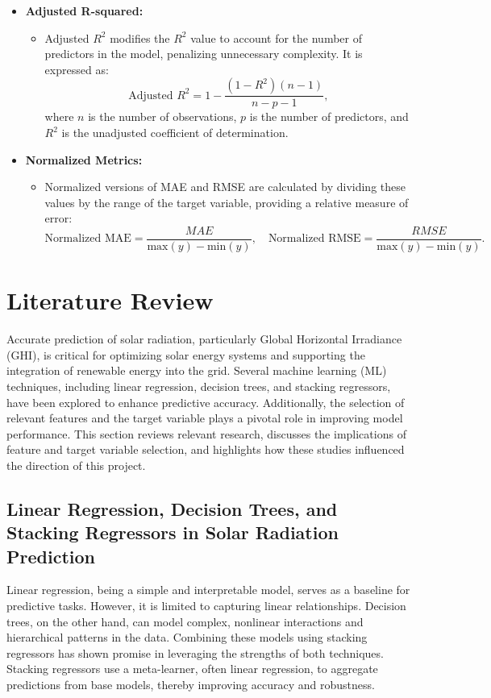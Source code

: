 \documentclass[10pt,twocolumn]{article}
\begin{document}
\begin{itemize}
\begin{itemize}
    \item \textbf{Adjusted R-squared:}
    \begin{itemize}
        \item  Adjusted \( R^2 \) modifies the \( R^2 \) value to account for the number of predictors in the model, penalizing unnecessary complexity. It is expressed as:
        \[
        \text{Adjusted } R^2 = 1 - \frac{(1 - R^2)(n - 1)}{n - p - 1},
        \]
        where \( n \) is the number of observations, \( p \) is the number of predictors, and \( R^2 \) is the unadjusted coefficient of determination.
    \end{itemize}

    \item \textbf{Normalized Metrics:}
    \begin{itemize}
        \item  Normalized versions of MAE and RMSE are calculated by dividing these values by the range of the target variable, providing a relative measure of error:
        \[
        \text{Normalized MAE} = \frac{MAE}{\text{max}(y) - \text{min}(y)}, \quad \text{Normalized RMSE} = \frac{RMSE}{\text{max}(y) - \text{min}(y)}.
        \]
    \end{itemize}
\end{itemize}


\section{Literature Review}

Accurate prediction of solar radiation, particularly Global Horizontal Irradiance (GHI), is critical for optimizing solar energy systems and supporting the integration of renewable energy into the grid. Several machine learning (ML) techniques, including linear regression, decision trees, and stacking regressors, have been explored to enhance predictive accuracy. Additionally, the selection of relevant features and the target variable plays a pivotal role in improving model performance. This section reviews relevant research, discusses the implications of feature and target variable selection, and highlights how these studies influenced the direction of this project.

\subsection{Linear Regression, Decision Trees, and Stacking Regressors in Solar Radiation Prediction}
Linear regression, being a simple and interpretable model, serves as a baseline for predictive tasks. However, it is limited to capturing linear relationships. Decision trees, on the other hand, can model complex, nonlinear interactions and hierarchical patterns in the data. Combining these models using stacking regressors has shown promise in leveraging the strengths of both techniques. Stacking regressors use a meta-learner, often linear regression, to aggregate predictions from base models, thereby improving accuracy and robustness.


\end{itemize}
\end{document}
